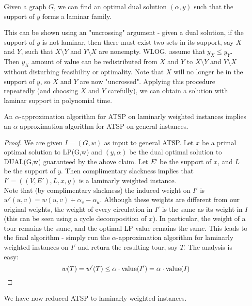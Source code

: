 \documentclass[./main.tex]{subfiles}
\begin{document}
\begin{claim*}Given a graph $G$, we can find an optimal dual solution $(\alpha, y)$ such that the support of $y$ forms a laminar family.\end{claim*}
This can be shown using an "uncrossing" argument - given a dual solution, if the support of $y$ is not laminar, then there must exist two sets in its support, say $X$ and $Y$, such that $X\setminus Y$ and $Y\setminus X$ are nonempty. WLOG, assume that $y_X \leq y_Y$. Then $y_X$ amount of value can be redistributed from $X$ and $Y$ to $X\setminus Y$ and $Y\setminus X$ without disturbing feasibility or optimality. Note that $X$ will no longer be in the support of $y$, so $X$ and $Y$ are now "uncrossed". Applying this procedure repeatedly (and choosing $X$ and $Y$ carefully), we can obtain a solution with laminar support in polynomial time.\vspace{4mm}\\
\begin{minipage}{\textwidth}\begin{theorem} An $\alpha$-approximation algorithm for ATSP on laminarly weighted instances implies an $\alpha$-approximation algorithm for ATSP on general instances.
\end{theorem}
\begin{proof} We are given $I=(G,w)$ as input to general ATSP. Let $x$ be a primal optimal solution to LP(G,w) and $(y,\alpha)$ be the dual optimal solution to DUAL(G,w) guaranteed by the above claim. Let $E'$ be the support of $x$, and $L$ be the support of $y$. Then complimentary slackness implies that $I'=((V,E'), L, x, y)$ is a laminarly weighted instance.\vspace{2mm}
\\Note that (by complimentary slackness) the induced weight on $I'$ is $w'(u,v) = w(u,v) + \alpha_v - \alpha_u$. Although these weights are different from our original weights, the weight of every circulation in $I'$ is the same as its weight in $I$ (this can be seen using a cycle decomposition of $x$). In particular, the weight of a tour remains the same, and the optimal LP-value remains the same. This leads to the final algorithm - simply run the $\alpha$-approximation algorithm for laminarly weighted instances on $I'$ and return the resulting tour, say $T$. The analysis is easy: \[w(T) = w'(T)\leq \alpha\cdot \textup{value}(I') = \alpha\cdot\textup{value}(I)\]
\end{proof}\end{minipage}\vspace{6mm}
We have now reduced ATSP to laminarly weighted instances.\vspace{2mm}
\end{document}

